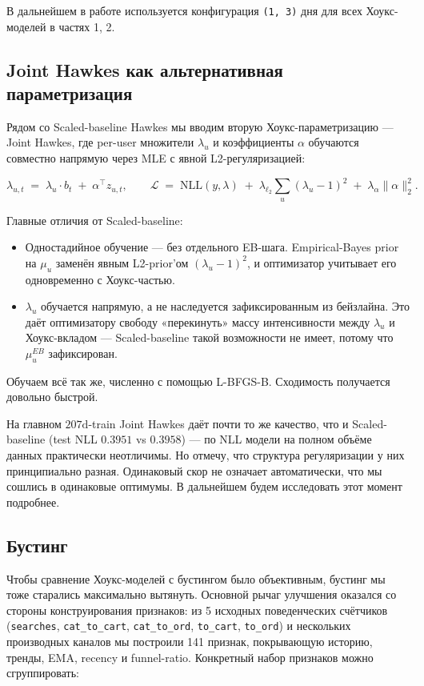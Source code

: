 \documentclass[12pt,a4paper]{article}
\begin{document}
В дальнейшем в работе используется конфигурация \texttt{(1, 3)} дня для всех Хоукс-моделей в частях 1, 2.

\FloatBarrier
\subsection{Joint Hawkes как альтернативная параметризация}

Рядом со Scaled-baseline Hawkes мы вводим вторую Хоукс-параметризацию --- Joint Hawkes, где per-user множители $\lambda _u$ и коэффициенты $\alpha $ обучаются совместно напрямую через MLE с явной L2-регуляризацией:

\[
\lambda_{u,t} \;=\; \lambda_u \cdot b_t \;+\; \alpha^{\top} z_{u,t}, \qquad \mathcal{L} \;=\; \mathrm{NLL}(y, \lambda) \;+\; \lambda_{\ell_2} \sum_u (\lambda_u - 1)^2 \;+\; \lambda_\alpha \|\alpha\|_2^2.
\]

Главные отличия от Scaled-baseline:

\begin{itemize}
  \item Одностадийное обучение --- без отдельного EB-шага. Empirical-Bayes prior на $\mu _u$ заменён явным L2-prior'ом $(\lambda _u - 1)^2$, и оптимизатор учитывает его одновременно с Хоукс-частью.
  \item $\lambda _u$ обучается напрямую, а не наследуется зафиксированным из бейзлайна. Это даёт оптимизатору свободу «перекинуть» массу интенсивности между $\lambda _u$ и Хоукс-вкладом --- Scaled-baseline такой возможности не имеет, потому что $\mu _u^{EB}$ зафиксирован.
\end{itemize}


Обучаем всё так же, численно с помощью L-BFGS-B. Сходимость получается довольно быстрой.

На главном $207\text{d}$-train Joint Hawkes даёт почти то же качество, что и Scaled-baseline (test NLL $0.3951$ vs $0.3958$) --- по NLL модели на полном объёме данных практически неотличимы. Но отмечу, что структура регуляризации у них принципиально разная. Одинаковый скор не означает автоматически, что мы сошлись в одинаковые оптимумы. В дальнейшем будем исследовать этот момент подробнее.

\FloatBarrier
\subsection{Бустинг}

Чтобы сравнение Хоукс-моделей с бустингом было объективным, бустинг мы тоже старались максимально вытянуть. Основной рычаг улучшения оказался со стороны конструирования признаков: из 5 исходных поведенческих счётчиков (\texttt{searches}, \texttt{cat\_to\_cart}, \texttt{cat\_to\_ord}, \texttt{to\_cart}, \texttt{to\_ord}) и нескольких производных каналов мы построили 141 признак, покрывающую историю, тренды, EMA, recency и funnel-ratio. Конкретный набор признаков можно сгруппировать:
\end{document}
